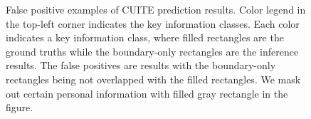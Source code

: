 \documentclass[10pt,twocolumn,letterpaper]{article}
\begin{document}
\begin{figure}
\begin{center}
\end{center}
   \caption{False positive examples of CUITE prediction results. Color legend in the top-left corner indicates the key information classes. Each color indicates a key information class, where filled rectangles are the ground truths while the boundary-only rectangles are the inference results. The false positives are results with the boundary-only rectangles being not overlapped with the filled rectangles. We mask out certain personal information with filled gray rectangle in the figure.}
\label{fig:falsepositive}
\end{figure}
\end{document}
